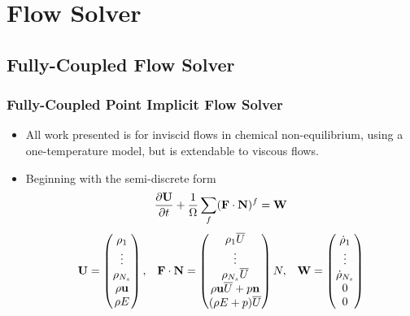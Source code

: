 \documentclass{beamer}
\begin{document}
\section{Flow Solver}

\subsection{Fully-Coupled Flow Solver}
\begin{frame}
  \frametitle{Fully-Coupled Point Implicit Flow Solver}
  \begin{itemize}
    \item All work presented is for inviscid flows in chemical non-equilibrium,
      using a one-temperature model, but is extendable to viscous flows.
    \item Beginning with the semi-discrete form
    \begin{equation*}
    	\label{inv_flux_fv}
    	\frac{\partial \mathbf U}{\partial t}
    	 + \frac{1}{\Omega}\sum\limits_{f}(\mathbf F \cdot \mathbf{N})^f = \mathbf W
    \end{equation*}
    \begin{equation*}
    	\begin{matrix}
    	\mathbf U=\begin{pmatrix}
       		\rho_1\\
    		\vdots \\
    		\rho_{N_s} \\
    		\rho \mathbf u \\
    		\rho E \\
    	\end{pmatrix},      &
     	\mathbf F \cdot \mathbf{N} = \begin{pmatrix}
    		\rho_1  \overline{U} \\
    		\vdots \\
    		\rho_{N_s} \overline{U} \\
    		\rho \mathbf u \overline{U} + p \mathbf{n} \\
    		(\rho E + p) \overline{U} \\
    	\end{pmatrix} N,    &
     	\mathbf W = \begin{pmatrix}
        \dot\rho_1\\
    		\vdots \\
    		\dot\rho_{N_s} \\
        0 \\
        0
      \end{pmatrix}

  	\end{matrix}
  \end{equation*}

  \end{itemize}
\end{frame}
\end{document}
